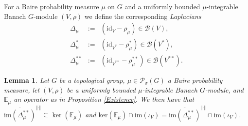 \documentclass[a4paper,11pt,reqno]{amsart}
\numberwithin{equation}{section}
\newtheorem{lemma}[theorem]{Lemma}
\theoremstyle{definition}
\theoremstyle{remark}
\theoremstyle{remark}
\begin{document}
For a Baire probability measure $\mu$ on $G$ and a uniformly bounded $\mu$-integrable Banach $G$-module $(V,\rho)$ we define the corresponding \emph{Laplacians} 
\begin{eqnarray*}
\Delta_{\mu} & := & (\text{id}_{V}-\rho_{\mu})\in\mathcal{B}(V),\\
\Delta_{\mu}^{\ast} & := & (\text{id}_{V^{\ast}}-\rho_{\mu}^{\ast})\in\mathcal{B}(V^{\ast}),\\
\Delta_{\mu}^{\ast\ast} & := & (\text{id}_{V^{\ast\ast}}-\rho_{\mu}^{\ast\ast})\in\mathcal{B}(V^{\ast\ast}).
\end{eqnarray*}

\begin{lemma} \label{Inclusion} Let $G$ be a topological group, $\mu\in\mathcal{P}_{\sigma}(G)$ a Baire probability measure, let $(V,\rho)$ be a uniformly bounded $\mu$-integrable Banach $G$-module, and $\mathbb{E}_{\mu}$ an operator as in Proposition \ref{Existence}. We then have that \emph{$\overline{\text{im}(\Delta_{\mu}^{\ast\ast})}^{\Vert\cdot\Vert}\subseteq\ker(\mathbb{E}_{\mu})$} and \emph{$\text{ker}(\mathbb{E}_{\mu})\cap\text{im}(\iota_{V})=\overline{\text{im}(\Delta_{\mu}^{\ast\ast})}^{\Vert\cdot\Vert}\cap\text{im}(\iota_{V})$}. \end{lemma}
\end{document}
